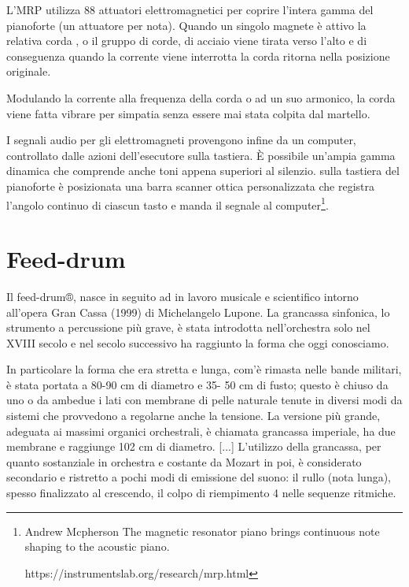 L'MRP utilizza 88 attuatori elettromagnetici per coprire l'intera gamma del
pianoforte (un attuatore per nota).
Quando un singolo magnete è attivo la relativa corda , o il gruppo di corde, di
acciaio viene tirata verso l’alto e di conseguenza quando la corrente viene
interrotta la  corda ritorna nella posizione originale.

Modulando la corrente alla frequenza della corda o ad un suo armonico, la corda
viene fatta vibrare per simpatia senza essere mai stata colpita dal martello.

I segnali audio per gli elettromagneti provengono infine da un computer,
controllato dalle azioni dell’esecutore sulla tastiera. È possibile un'ampia
gamma dinamica che comprende anche toni appena superiori al silenzio.
sulla tastiera del pianoforte è posizionata una barra scanner ottica
personalizzata che registra l'angolo continuo di ciascun tasto e manda il
segnale al computer\footnote{ Andrew Mcpherson The magnetic resonator piano
brings continuous note shaping to the acoustic piano.

https://instrumentslab.org/research/mrp.html}.

\section{Feed-drum}

Il feed-drum®, nasce in seguito ad in lavoro musicale e scientifico intorno
all’opera Gran Cassa  (1999) di Michelangelo Lupone.
La grancassa sinfonica, lo strumento a percussione più grave, è stata introdotta
nell’orchestra solo nel XVIII secolo e nel secolo successivo ha raggiunto la
forma che oggi conosciamo.

In particolare la forma che era stretta e lunga, com’è rimasta nelle bande
militari, è stata portata a 80-90 cm di diametro e 35- 50 cm di fusto; questo
è chiuso da uno o da ambedue i lati con membrane di pelle naturale tenute in
diversi modi da sistemi che provvedono a regolarne anche la tensione.
La versione più grande, adeguata ai massimi organici orchestrali, è chiamata
grancassa imperiale, ha due membrane e raggiunge 102 cm di diametro. [...]
L’utilizzo della grancassa, per quanto sostanziale in orchestra e costante da
Mozart in poi, è considerato secondario e ristretto a pochi modi di emissione
del suono: il rullo (nota lunga), spesso finalizzato al crescendo, il colpo di
riempimento 4 nelle sequenze ritmiche.

